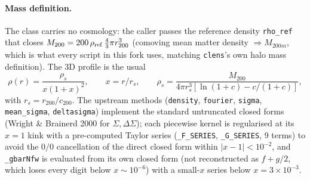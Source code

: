 \documentclass[a4paper, 11pt]{article}
\newcommand{\modname}[1]{\textcolor{kwcol}{\texttt{#1}}}
\begin{document}
\paragraph{Mass definition.} The class carries no cosmology: the
caller passes the reference density \texttt{rho\_ref} that closes
$M_{200} = 200\,\rho_{\rm ref}\,\tfrac{4}{3}\pi r_{200}^3$ (comoving
mean matter density $\Rightarrow M_{200m}$, which is what every script
in this fork uses, matching \modname{clens}'s own halo mass
definition). The 3D profile is the usual
\begin{equation}
  \rho(r) = \frac{\rho_s}{x(1+x)^2}, \qquad x = r/r_s, \qquad
  \rho_s = \frac{M_{200}}{4\pi r_s^3\left[\ln(1+c) - c/(1+c)\right]},
\end{equation}
with $r_s = r_{200}/c_{200}$. The upstream methods (\texttt{density},
\texttt{fourier}, \texttt{sigma}, \texttt{mean\_sigma},
\texttt{deltasigma}) implement the standard untruncated closed forms
(Wright \& Brainerd 2000 for $\Sigma,\Delta\Sigma$); each piecewise
kernel is regularised at its $x=1$ kink with a pre-computed Taylor
series (\texttt{\_F\_SERIES}, \texttt{\_G\_SERIES}, 9 terms) to avoid
the $0/0$ cancellation of the direct closed form within
$|x-1|<10^{-2}$, and \texttt{\_gbarNfw} is evaluated from its own
closed form (not reconstructed as $f + g/2$, which loses every digit
below $x\sim 10^{-6}$) with a small-$x$ series below $x = 3\times
10^{-3}$.
\end{document}
